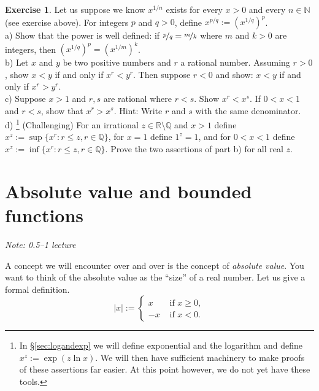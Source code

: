 \documentclass[12pt]{book}
\newcommand{\abs}[1]{\left\lvert {#1} \right\rvert}
\newcommand{\R}{{\mathbb{R}}}
\newcommand{\N}{{\mathbb{N}}}
\newcommand{\Q}{{\mathbb{Q}}}
\newcommand{\myindex}[1]{#1\index{#1}}
\newcommand{\sectionnotes}[1]{\noindent \emph{Note: #1} \medskip \par}
\newcommand{\sectionnewpage}{\clearpage}
\theoremstyle{plain}
\theoremstyle{remark}
\theoremstyle{definition}
\theoremstyle{exercise}
\newtheorem{exercise}{Exercise}[section]
\theoremstyle{example}
\newcommand{\sectionref}[1]{\hyperref[#1]{\S\ref*{#1}}}
\begin{document}
\begin{exercise} \label{exercise:realpower}
Let us suppose we know $x^{1/n}$ exists for every $x > 0$ and every $n \in
\N$ (see exercise above).  For integers $p$ and $q > 0$, define $x^{p/q} :=
{(x^{1/q})}^p$.\\
a) Show that the power is well defined: if $\nicefrac{p}{q} =
\nicefrac{m}{k}$ where $m$ and $k > 0$ are integers, then 
${(x^{1/q})}^p = {(x^{1/m})}^k$.
\\
b)
Let $x$ and $y$ be two positive numbers and $r$ a rational number.
Assuming $r > 0$, show
$x < y$ if and only if $x^r < y^r$.  Then suppose $r < 0$ and show:
$x < y$ if and only if $x^r > y^r$.
\\
c) 
Suppose $x > 1$ and $r,s$ are rational where $r < s$.
Show $x^r < x^s$.  If $0 < x < 1$ and $r < s$, show that $x^r > x^s$.
Hint: Write $r$ and $s$ with the same denominator.
\\
d)%
\footnote{In
\sectionref{sec:logandexp}
we will define exponential and the logarithm and
define $x^z := \exp(z \ln x)$.  We will then have 
sufficient machinery to make proofs of these assertions far easier.  At this
point however, we do not yet have these tools.}
(Challenging)
For an irrational $z \in \R \setminus \Q$ and $x > 1$ define
$x^z := \sup \{ x^r : r \leq z, r \in \Q \}$,
for $x=1$ define $1^z = 1$,
and for $0 < x < 1$ define
$x^z := \inf \{ x^r : r \leq z, r \in \Q \}$.
Prove the two assertions of part b) for all real $z$.
\end{exercise}




\sectionnewpage
\section{Absolute value and bounded functions} \label{sec:absval}

\sectionnotes{0.5--1 lecture}

A concept we will encounter over and over is the concept of
\emph{\myindex{absolute value}}.
You want to think of the absolute value as the ``size'' of a real number.
Let us give a formal definition.
\begin{equation*}
\abs{x} :=
\begin{cases}
x & \text{ if $x \geq 0$}, \\
-x & \text{ if $x < 0$} .
\end{cases}
\end{equation*}
\end{document}
